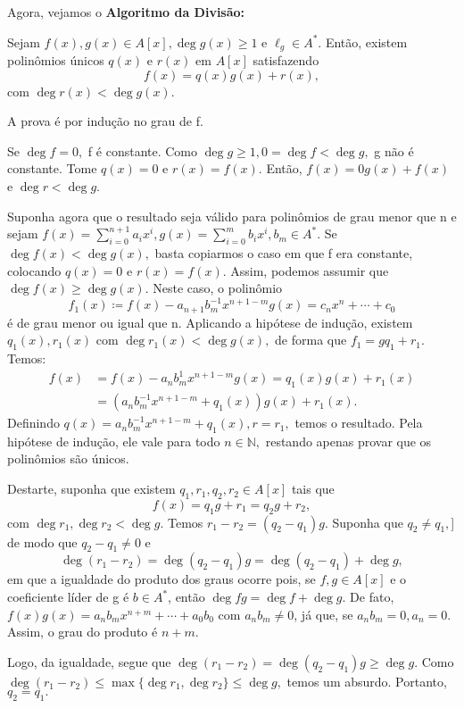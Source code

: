\documentclass[AlgebraII/algebraII_notes.tex]{subfiles}
\begin{document}
Agora, vejamos o \textbf{Algoritmo da Divisão:}
\begin{theorem*}
	Sejam \(f(x), g(x)\in A[x], \deg{g(x)}\geq 1\) e \(\ell_{g}\in A^{*}.\) Então,
	existem polinômios únicos \(q(x)\) e \(r(x)\) em \(A[x]\) satisfazendo
	\[
		f(x) = q(x)g(x) + r(x),
	\]
	com \(\deg{r(x)} < \deg{g(x)}.\)
\end{theorem*}
\begin{proof*}
	A prova é por indução no grau de f.

	Se \(\deg{f}=0,\) f é constante. Como \(\deg{g}\geq 1, 0 = \deg{f} < \deg{g},\) g não é constante.
	Tome \(q(x) = 0\) e \(r(x) = f(x).\) Então, \(f(x) = 0g(x) + f(x)\) e \(\deg{r} < \deg{g}.\)

	Suponha agora que o resultado seja válido para polinômios de grau menor que n e sejam \(f(x) = \sum\limits_{i=0}^{n+1}a_{i}x^{i}, g(x) = \sum\limits_{i=0}^{m}b_{i}x^{i}, b_{m}\in A^{*}\).
	Se \(\deg{f(x)} < \deg{g(x)},\) basta copiarmos o caso em que f era constante, colocando \(q(x) = 0\) e \(r(x) = f(x)\).
	Assim, podemos assumir que \(\deg{f(x)}\geq \deg{g(x)}.\) Neste caso, o polinômio
	\[
		f_{1}(x)\coloneqq f(x) - a_{n+1}b_{m}^{-1}x^{n+1-m}g(x) = c_{n}x^{n} + \cdots + c_{0}
	\]
	é de grau menor ou igual que n. Aplicando a hipótese de indução, existem \(q_{1}(x), r_{1}(x)\)
	com \(\deg{r_{1}(x)} < \deg{g(x)},\) de forma que \(f_{1} = gq_{1} + r_{1}.\) Temos:
	\begin{align*}
		f(x) & = f(x)-a_{n}b_{m}^{1}x^{n+1-m}g(x) = q_{1}(x)g(x) + r_{1}(x) \\
		     & = (a_{n}b_{m}^{-1}x^{n+1-m}+q_{1}(x))g(x) + r_{1}(x).
	\end{align*}
	Definindo \(q(x) = a_{n}b_{m}^{-1}x^{n+1-m}+q_{1}(x), r = r_{1},\) temos o resultado. Pela hipótese
	de indução, ele vale para todo \(n\in \mathbb{N},\) restando apenas provar que os polinômios são únicos.

	Destarte, suponha que existem \(q_{1}, r_{1}, q_{2}, r_{2}\in A[x]\) tais que
	\[
		f(x) = q_{1}g+r_{1} = q_{2}g+r_{2},
	\]
	com \(\deg{r_{1}}, \deg{r_{2}} < \deg{g}.\) Temos \(r_{1}-r_{2} = (q_{2}-q_{1})g.\) Suponha que \(q_{2}\neq q_{1},\)]
	de modo que \(q_{2}-q_{1}\neq0\) e
	\[
		\deg{(r_{1}-r_{2})} = \deg{(q_{2}-q_{1})}g = \deg{(q_{2}-q_{1})} + \deg{g},
	\]
	em que a igualdade do produto dos graus ocorre pois, se \(f, g\in A[x]\) e o coeficiente líder de g é \(b\in A^{*}\),
	então \(\deg{fg} = \deg{f} + \deg{g}.\) De fato, \(f(x)g(x) = a_{n}b_{m}x^{n+m} + \cdots + a_{0}b_{0}\) com
	\(a_{n}b_{m}\neq0\), já que, se \(a_{n}b_{m} = 0, a_{n} = 0.\) Assim, o grau do produto é \(n+m\).

	Logo, da igualdade, segue que \(\deg{(r_{1}-r_{2})} = \deg{(q_{2}-q_{1})g}\geq \deg{g}.\) Como
	\(\deg{(r_{1}-r_{2})}\leq \max\{\deg{r_{1}}, \deg{r_{2}}\}\leq \deg{g},\) temos um absurdo. Portanto,
	\(q_{2} = q_{1}.\) \qedsymbol
\end{proof*}
\end{document}
